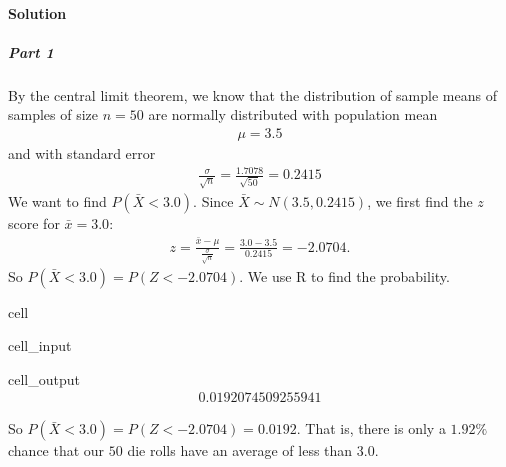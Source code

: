 \documentclass[letterpaper,10pt,english]{jupyterBook}
\begin{document}
\paragraph{Solution}
\label{\detokenize{Ch4 The Normal Distribution and the Central Limit Theorem/4.4 The Central Limit Theorem for Means:solution}}

\subparagraph{Part 1}
\label{\detokenize{Ch4 The Normal Distribution and the Central Limit Theorem/4.4 The Central Limit Theorem for Means:part-1}}
\sphinxAtStartPar
By the central limit theorem, we know that the distribution of sample means of samples of size \(n = 50\) are normally distributed with population mean
\begin{equation*}
\begin{split}\mu = 3.5\end{split}
\end{equation*}
\sphinxAtStartPar
and with standard error
\begin{equation*}
\begin{split}\frac{\sigma}{\sqrt{n}} = \frac{1.7078}{\sqrt{50}} = 0.2415\end{split}
\end{equation*}
\sphinxAtStartPar
We want to find \(P(\bar{X} < 3.0)\). Since \(\bar{X} \sim N(3.5, 0.2415)\), we first find the \(z\)\sphinxhyphen{}score for \(\bar{x} = 3.0\):
\begin{equation*}
\begin{split}z = \frac{\bar{x} - \mu}{\frac{\sigma}{\sqrt{n}}} = \frac{3.0 - 3.5}{0.2415} = -2.0704. \end{split}
\end{equation*}
\sphinxAtStartPar
So \(P(\bar{X} < 3.0) = P(Z < -2.0704)\). We use R to find the probability.

\begin{sphinxuseclass}{cell}\begin{sphinxVerbatimInput}

\begin{sphinxuseclass}{cell_input}
\begin{sphinxVerbatim}[commandchars=\\\{\}]
\end{sphinxVerbatim}

\end{sphinxuseclass}\end{sphinxVerbatimInput}
\begin{sphinxVerbatimOutput}

\begin{sphinxuseclass}{cell_output}\begin{equation*}
\begin{split}0.0192074509255941\end{split}
\end{equation*}
\end{sphinxuseclass}\end{sphinxVerbatimOutput}

\end{sphinxuseclass}
\sphinxAtStartPar
So \(P(\bar{X} < 3.0) = P(Z < -2.0704) = 0.0192\). That is, there is only a \(1.92\%\) chance that our \(50\) die rolls have an average of less than \(3.0\).
\end{document}
